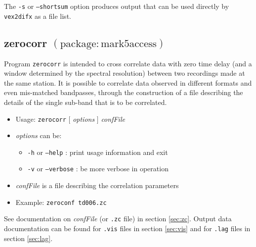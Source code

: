 The {\tt -s} or {\tt --shortsum} option produces output that can be used directly by {\tt vex2difx} as a file list.




\subsection{zerocorr {\small $\mathrm{(package: mark5access)}$}} \label{sec:zerocorr}

Program {\tt zerocorr} is intended to cross correlate data with zero time delay (and a window determined by the spectral resolution) between two recordings made at the same station.
It is possible to correlate data observed in different formats and even mis-matched bandpasses, through the construction of a file describing the details of the single sub-band that is to be correlated.

\begin{itemize}
\item[] Usage: {\tt zerocorr} $[$ {\em options} $]$ {\em confFile} 
\item[] {\em options} can be:
\begin{itemize}
\item[] {\tt -h} or {\tt --help} : print usage information and exit
\item[] {\tt -v} or {\tt --verbose} : be more verbose in operation
\end{itemize}
\item[] {\em confFile} is a file describing the correlation parameters
\item[] Example: {\tt zeroconf td006.zc}
\end{itemize}

See documentation on {\em confFile} (or {\tt .zc} file) in section \ref{sec:zc}.
Output data documentation can be found for {\tt .vis} files in section \ref{sec:vis} and for {\tt .lag} files in section \ref{sec:lag}.
